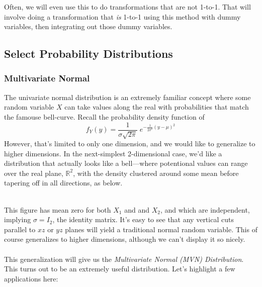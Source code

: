 \documentclass[12pt]{article}
\theoremstyle{plain}
\theoremstyle{definition}
\theoremstyle{remark}
\begin{document}
Often, we will even use this to do transformations that are not
1-to-1. That will involve doing a transformation that \emph{is}
1-to-1 using this method with dummy variables, then integrating
out those dummy variables.


\clearpage
\subsection{Select Probability Distributions}


\subsubsection{Multivariate Normal}

The univariate normal distribution is an extremely familiar concept
where some random variable $X$ can take values along the real with
probabilities that match the famouse bell-curve. Recall the probability
density function of
   \[ f_Y(y) = \frac{1}{\sigma \sqrt{2\pi}} \; e^{-\frac{1}{2\sigma^2}
      (y - \mu)^2} \]
However, that's limited to only one dimension, and we would like to
generalize to higher dimensions. In the next-simplest 2-dimensional
case, we'd like a distribution that actually looks like a bell---where
potentional values can range over the real plane, $\mathbb{R}^2$, with
the density clustered around some mean before tapering off in all
directions, as below.
\begin{figure}[h!]
   \centering
\end{figure}
\\
This figure has mean zero for both $X_1$ and and $X_2$, and
which are independent, implying $\sigma = I_2$, the identity matrix.
It's easy to see that any vertical cuts parallel to $xz$ or $yz$ planes
will yield a traditional normal random variable. This of course
generalizes to higher dimensions, although we can't display it so nicely.
\\
\\
This generalization will give us the
\emph{Multivariate Normal (MVN) Distribution}.
This turns out to be an extremely useful distribution. Let's highlight
a few applications here:
\end{document}
